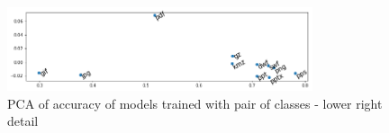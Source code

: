 \noindent
\begin{figure}[htb!]
\centering\includegraphics[width=0.8\textwidth]{content/pca2.png}
\caption[PCA of accuracy of models trained with pair of classes - detail]{\label{fig:pca2}PCA of accuracy of models trained with pair of classes - lower right detail}%
\end{figure}

